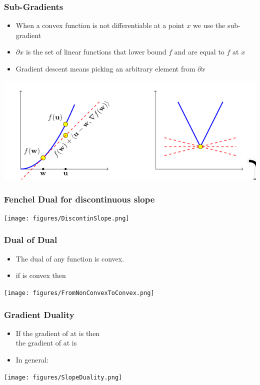 \documentclass[handout]{beamer}
\begin{document}
\begin{frame}
  \frametitle{Sub-Gradients}
  \begin{itemize}
  \item   When a convex function  is not differentiable at a point $x$ we use the sub-gradient 
  \item $\partial x$ is the set of linear functions that lower bound $f$ and are equal to $f$ at $x$
  \item Gradient descent means picking an arbitrary element from $\partial x$
  \end{itemize}
  \includegraphics[width=\textwidth]{figures/SubGradient.png}

\end{frame}

\begin{frame}
  \frametitle{Fenchel Dual for discontinuous slope}
    \texttt{[image: figures/DiscontinSlope.png]}

\end{frame}

\begin{frame}
  \frametitle{Dual of Dual}
  \begin{itemize}
  \item The dual of any function is convex.
  \item if  is convex then 
  \end{itemize}
  \texttt{[image: figures/FromNonConvexToConvex.png]}  
\end{frame}

\begin{frame}
  \frametitle{Gradient Duality}
  \begin{itemize}
  \item
    If the gradient of  at  is  then\\
    the gradient of  at  is 
    \item In general:
  \end{itemize}
  \texttt{[image: figures/SlopeDuality.png]}
\end{frame}
\end{document}
